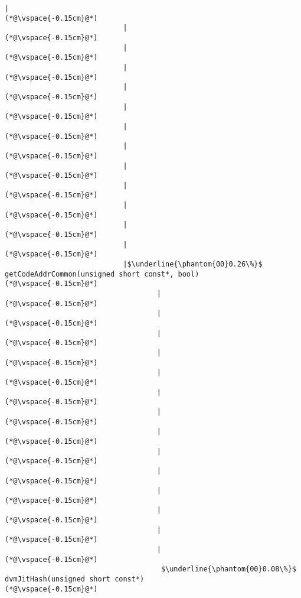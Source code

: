 \begin{lstlisting}[caption=Staattinen metodi Java$\to$C , label=profile:J2CBenchmark00001, numberbychapter=true, frame=lines, float, floatplacement=t]
                            |
(*@\vspace{-0.15cm}@*)
                            |
(*@\vspace{-0.15cm}@*)
                            |
(*@\vspace{-0.15cm}@*)
                            |
(*@\vspace{-0.15cm}@*)
                            |
(*@\vspace{-0.15cm}@*)
                            |
(*@\vspace{-0.15cm}@*)
                            |
(*@\vspace{-0.15cm}@*)
                            |
(*@\vspace{-0.15cm}@*)
                            |
(*@\vspace{-0.15cm}@*)
                            |
(*@\vspace{-0.15cm}@*)
                            |
(*@\vspace{-0.15cm}@*)
                            |
(*@\vspace{-0.15cm}@*)
                            |
(*@\vspace{-0.15cm}@*)
                            |$\underline{\phantom{00}0.26\%}$ getCodeAddrCommon(unsigned short const*, bool)
(*@\vspace{-0.15cm}@*)
                                    |
(*@\vspace{-0.15cm}@*)
                                    |
(*@\vspace{-0.15cm}@*)
                                    |
(*@\vspace{-0.15cm}@*)
                                    |
(*@\vspace{-0.15cm}@*)
                                    |
(*@\vspace{-0.15cm}@*)
                                    |
(*@\vspace{-0.15cm}@*)
                                    |
(*@\vspace{-0.15cm}@*)
                                    |
(*@\vspace{-0.15cm}@*)
                                    |
(*@\vspace{-0.15cm}@*)
                                    |
(*@\vspace{-0.15cm}@*)
                                    |
(*@\vspace{-0.15cm}@*)
                                    |
(*@\vspace{-0.15cm}@*)
                                    |
(*@\vspace{-0.15cm}@*)
                                    |
(*@\vspace{-0.15cm}@*)
                                     $\underline{\phantom{00}0.08\%}$ dvmJitHash(unsigned short const*)
(*@\vspace{-0.15cm}@*)
                             

\end{lstlisting}
